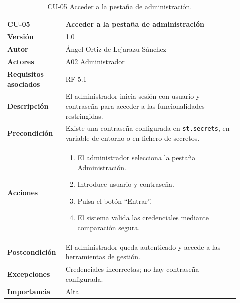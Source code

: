 \begin{table}[H]
	\centering
	\begin{tabular}{ p{0.21\linewidth} p{0.71\linewidth} }
		\toprule
		\textbf{CU-05}    & \textbf{Acceder a la pestaña de administración}\\
		\toprule
		\textbf{Versión}              & 1.0 \\
		\textbf{Autor}                & Ángel Ortiz de Lejarazu Sánchez \\
		\textbf{Actores}              & A02 Administrador \\
		\textbf{Requisitos asociados} & RF-5.1 \\
		\textbf{Descripción}          & El administrador inicia sesión con usuario y contraseña para acceder a las funcionalidades restringidas. \\
		\textbf{Precondición}         & Existe una contraseña configurada en \texttt{st.secrets}, en variable de entorno o en fichero de secretos. \\
		\textbf{Acciones}             &
		\begin{enumerate}
			\def\labelenumi{\arabic{enumi}.}
			\item El administrador selecciona la pestaña Administración.
			\item Introduce usuario y contraseña.
			\item Pulsa el botón ``Entrar''.
			\item El sistema valida las credenciales mediante comparación segura.
		\end{enumerate} \\
		\textbf{Postcondición}        & El administrador queda autenticado y accede a las herramientas de gestión. \\
		\textbf{Excepciones}          & Credenciales incorrectas; no hay contraseña configurada. \\
		\textbf{Importancia}          & Alta \\
		\bottomrule
	\end{tabular}
	\caption{CU-05 Acceder a la pestaña de administración.}
\end{table}

